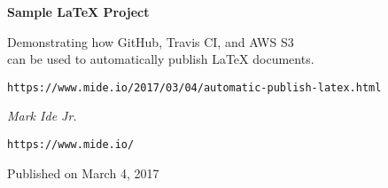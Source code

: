 \documentclass[12pt,letterpaper]{report}
\begin{document}
\begin{titlepage}
  \centering
  {\huge\bfseries Sample \LaTeX{} Project\par}
  \vspace{.5in}
  Demonstrating how GitHub, Travis CI, and AWS S3\\
  can be used to automatically publish \LaTeX{} documents.
  \vfill
  {\texttt{https://www.mide.io/2017/03/04/automatic-publish-latex.html}\par}
  \vfill
  {\Large\itshape Mark Ide Jr.\par}
  {\texttt{https://www.mide.io/}\par}
  {\large Published on March 4, 2017\par}
\end{titlepage}
\end{document}

